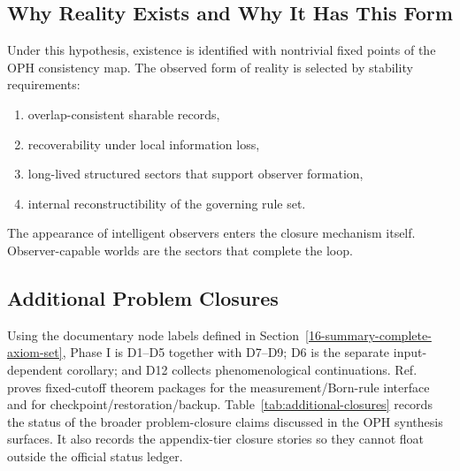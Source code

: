 \subsection{Why Reality Exists and Why It Has This Form}

Under this hypothesis, existence is identified with nontrivial fixed points of the OPH
consistency map. The observed form of reality is selected by stability requirements:
\begin{enumerate}
\item overlap-consistent sharable records,
\item recoverability under local information loss,
\item long-lived structured sectors that support observer formation,
\item internal reconstructibility of the governing rule set.
\end{enumerate}
The appearance of intelligent observers enters the closure mechanism itself. Observer-capable
worlds are the sectors that complete the loop.

\subsection{Additional Problem Closures}

Using the documentary node labels defined in Section~\ref{16-summary-complete-axiom-set}, Phase I
is D1--D5 together with D7--D9; D6 is the separate input-dependent corollary; and D12
collects phenomenological continuations. Ref.~\cite{ophmicrophysics} proves fixed-cutoff theorem
packages for the measurement/Born-rule interface and for checkpoint/restoration/backup.
Table~\ref{tab:additional-closures} records the status of the broader problem-closure claims
discussed in the OPH synthesis surfaces. It also records the appendix-tier closure stories so they
cannot float outside the official status ledger.

